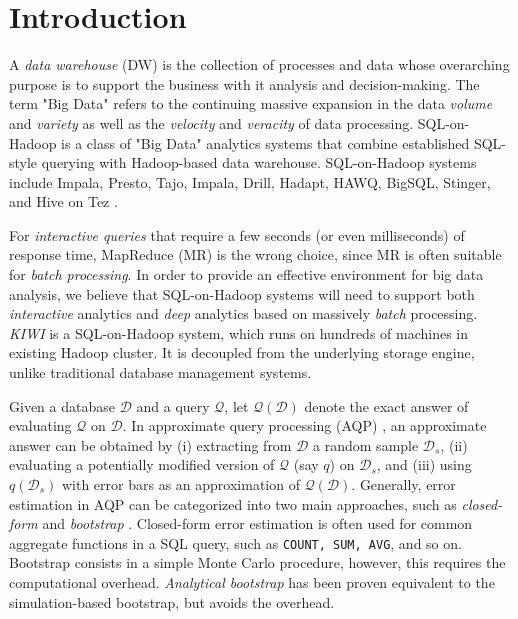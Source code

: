 \documentclass{sig-alternate-05-2015}
\begin{document}


%
%

%
%
\printccsdesc



\section{Introduction}
A \textit{data warehouse} (DW) is the collection of processes and data whose overarching purpose is to support the business with it analysis and decision-making. 
The term "Big Data" refers to the continuing massive expansion in the data \textit{volume} and \textit{variety} as well as the \textit{velocity} and \textit{veracity} of data processing.
SQL-on-Hadoop is a class of "Big Data" analytics systems that combine established SQL-style querying with Hadoop-based data warehouse.
SQL-on-Hadoop systems
include Impala, Presto,  Tajo, Impala, Drill, Hadapt, HAWQ, BigSQL, Stinger, and Hive on Tez \cite{Floratou:2014}.

For \textit{interactive queries} that require a few seconds (or even milliseconds) of response time, MapReduce (MR) is the wrong choice, since MR is often suitable for \textit{batch processing}. 
In order to provide an effective environment for big data analysis, we believe that SQL-on-Hadoop systems will need to support both \textit{interactive} analytics and \textit{deep} analytics based on massively \textit{batch} processing. 
\textit{KIWI} is a  SQL-on-Hadoop system, which runs on hundreds of machines in existing Hadoop cluster.
It is decoupled from the underlying storage engine, unlike traditional database management systems.

Given a database $\mathcal{D}$ and a query $\mathcal{Q}$, let $\mathcal{Q}(\mathcal{D})$ denote the exact answer of evaluating $\mathcal{Q}$ on $\mathcal{D}$. 
In approximate query processing (AQP) \cite{Agarwal:2014, Agarwal:2013}, an approximate answer can be obtained by (i) extracting from $\mathcal{D}$ a random sample $\mathcal{D}_s$, %
(ii) evaluating a potentially modified version of $\mathcal{Q}$ (say $q$) on $\mathcal{D}_s$, and (iii) using $q(\mathcal{D}_s)$ with error bars as an approximation of $\mathcal{Q}(\mathcal{D})$.
Generally, error estimation in AQP can be categorized into two main approaches, such as \textit{closed-form} and \textit{bootstrap} \cite{Chaudhuri:2007}.
Closed-form error estimation is often used for common aggregate functions in a SQL query, such as \texttt{COUNT, SUM, AVG}, and so on. 
Bootstrap consists in a simple Monte Carlo procedure, however, this requires the computational overhead. 
\textit{Analytical bootstrap} has been proven equivalent to the simulation-based bootstrap, but avoids the overhead. 
\end{document}
